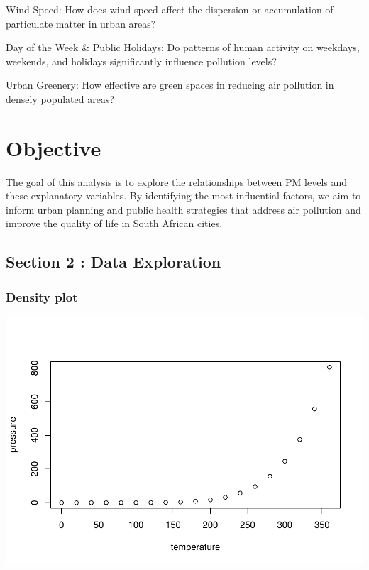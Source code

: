 \documentclass[
]{article}
\begin{document}
Wind Speed: How does wind speed affect the dispersion or accumulation of
particulate matter in urban areas?

Day of the Week \& Public Holidays: Do patterns of human activity on
weekdays, weekends, and holidays significantly influence pollution
levels?

Urban Greenery: How effective are green spaces in reducing air pollution
in densely populated areas?

\hypertarget{objective}{%
\section{Objective}\label{objective}}

The goal of this analysis is to explore the relationships between PM
levels and these explanatory variables. By identifying the most
influential factors, we aim to inform urban planning and public health
strategies that address air pollution and improve the quality of life in
South African cities.

\hypertarget{section-2-data-exploration}{%
\subsection{Section 2 : Data
Exploration}\label{section-2-data-exploration}}

\hypertarget{density-plot}{%
\subsubsection{Density plot}\label{density-plot}}

\includegraphics{Report_files/figure-latex/pressure-1.pdf}
\end{document}
